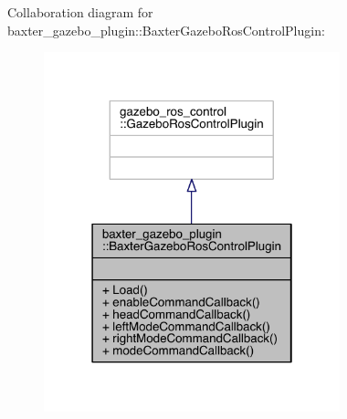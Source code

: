 Collaboration diagram for baxter\+\_\+gazebo\+\_\+plugin\+:\+:Baxter\+Gazebo\+Ros\+Control\+Plugin\+:\nopagebreak
\begin{figure}[H]
\begin{center}
\leavevmode
\includegraphics[width=243pt]{classbaxter__gazebo__plugin_1_1_baxter_gazebo_ros_control_plugin__coll__graph}
\end{center}
\end{figure}
